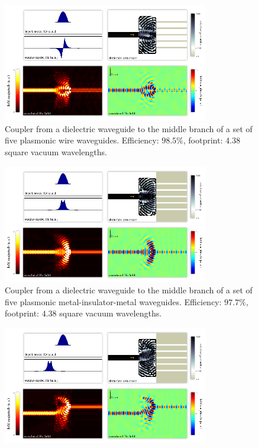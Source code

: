 \documentclass[letterpaper,10pt]{article}
\begin{document}
\begin{appendix}
\begin{figure}[h!]
    \includegraphics[width=0.8\textwidth]{18}
    \caption{
        Coupler from a dielectric waveguide to the 
            middle branch of a set of five plasmonic wire waveguides.
        Efficiency: $98.5\%$,
        footprint: $4.38$ square vacuum wavelengths.
        }
\end{figure}
\begin{figure}[h!]
    \centering
    \includegraphics[width=0.8\textwidth]{19}
    \caption{
        Coupler from a dielectric waveguide to the 
            middle branch of a set of five plasmonic 
            metal-insulator-metal waveguides.
        Efficiency: $97.7\%$,
        footprint: $4.38$ square vacuum wavelengths.
        }
\end{figure}
\begin{figure}[h!]
    \centering
    \includegraphics[width=0.8\textwidth]{20}

\end{figure}
\end{appendix}
\end{document}
